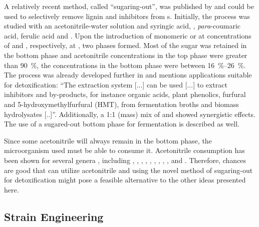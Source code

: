 A relatively recent method, called \enquote{sugaring-out}, was published by \textcite{Wang2008} and could be used to selectively remove lignin and inhibitors from \lch{}s. Initially, the process was studied with an acetonitrile-water solution and syringic acid, \fur{}, \textit{para}-coumaric acid, ferulic acid and \hmf{}. Upon the introduction of monomeric \glc{} or \xyl{} at concentrations of  and , respectively, at , two phases formed. Most of the sugar was retained in the bottom phase and acetonitrile concentrations in the top phase were greater than \SI{90}{\percent}, the concentrations in the bottom phase were between \SIrange{16}{26}{\percent}. The process was already developed further in \cite{PatentAppUS20090090894A1} and mentions applications suitable for \lch{} detoxification: \enquote{The extraction system [...] can be used [...] to extract inhibitors and by-products, for instance organic acids, plant phenolics, furfural and 5-hydroxymethylfurfural (HMT), from fermentation broths and biomass hydrolysates [..]}. Additionally, a 1:1 (mass) mix of \glc{} and \xyl{} showed synergistic effects. The use of a sugared-out bottom phase for fermentation is described as well.

Since some acetonitrile will always remain in the bottom phase, the microorganism used must be able to consume it. Acetonitrile consumption has been shown for several genera \cite{Li2007}, including  \cite{Asano1982a, Asano1982b},  \cite{Graham2000},  \cite{Thiery1986},  \cite{Dias2001},  \cite{Chapatwala1990},  \cite{Rezende2004},  \cite{Kao2006},  \cite{Prasad2005},  \cite{DiGeronimo1976, Bhalla2005},  \cite{Nawaz1989, Chapatwala1990, Babu1995} and  \cite{Watanabe1987, Acharya1997, Langdahl1996}. Therefore, chances are good that \strain{} can utilize acetonitrile and using the novel method of sugaring-out for \lch{} detoxification might pose a feasible alternative to the other ideas presented here.

\subsection{Strain Engineering}
